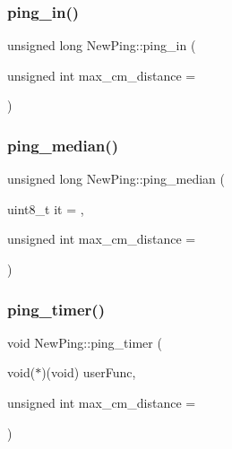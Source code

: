 \subsubsection{\texorpdfstring{ping\+\_\+in()}{ping\_in()}}
{\footnotesize\ttfamily unsigned long New\+Ping\+::ping\+\_\+in (\begin{DoxyParamCaption}\item[{unsigned int}]{max\+\_\+cm\+\_\+distance = {} }\end{DoxyParamCaption})}

\mbox{\label{class_new_ping_afd21db530da5856049d7f9684b448935}} 
\subsubsection{\texorpdfstring{ping\+\_\+median()}{ping\_median()}}
{\footnotesize\ttfamily unsigned long New\+Ping\+::ping\+\_\+median (\begin{DoxyParamCaption}\item[{uint8\+\_\+t}]{it = {},  }\item[{unsigned int}]{max\+\_\+cm\+\_\+distance = {} }\end{DoxyParamCaption})}

\mbox{\label{class_new_ping_a5b80f92a7885f82640a0b096c2d3c85e}} 
\subsubsection{\texorpdfstring{ping\+\_\+timer()}{ping\_timer()}}
{\footnotesize\ttfamily void New\+Ping\+::ping\+\_\+timer (\begin{DoxyParamCaption}\item[{void($\ast$)(void)}]{user\+Func,  }\item[{unsigned int}]{max\+\_\+cm\+\_\+distance = {} }\end{DoxyParamCaption})}

\mbox{\label{class_new_ping_a60172cfe9c5e9f035424da1883868b01}} 
